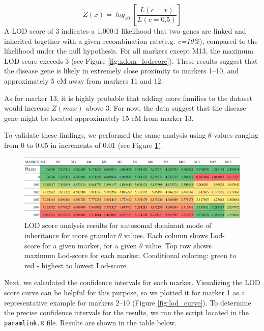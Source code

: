 \documentclass[a4paper,12pt]{article}
\begin{document}
\[
\mathit{Z(x) = \log_{10} \left[ \frac{L(c = x)}{L(c = 0.5)} \right]}
\]
A LOD score of 3 indicates a 1,000:1 likelihood that two genes are linked and inherited together with a given 
recombination rate(e.g. \textit{c=10\%}), compared to the likelihood under the null hypothesis.
For all markers except M13, the maximum LOD score exceeds 3 (see Figure \ref{fig:xdom_lodscore}).
These results suggest that the disease gene is likely in extremely close proximity to markers 1–10, 
and approximately 5 cM away from markers 11 and 12.

As for marker 13, it is highly probable that adding more families to the dataset would increase $\mathit{Z(max)}$ 
above 3. For now, the data suggest that the disease gene might be located approximately 15 cM from marker 13.

To validate these findings, we performed the same analysis using $\theta$ values ranging from 0 to 0.05 in 
increments of 0.01 (see Figure \ref{fig:xdom_lodscore_granular}).



\begin{figure}[t] %
    \centering
    \includegraphics[width=\textwidth]{images/xdom_lod_analysis_more_granular.png}
    \caption{LOD score analysis results for autosomal dominant mode of inheritance for more 
    granular $\theta$ values. Each column shows Lod-score for a given marker, for a given 
    $\theta$ value. Top row shows maximum Lod-score for each marker. Conditional coloring: 
    green to red - highest to lowest Lod-score.}   
    \label{fig:xdom_lodscore_granular} 
    
\end{figure}

Next, we calculated the confidence intervals for each marker. %
Visualizing the LOD score curve can be helpful for this purpose, so we plotted it for marker 1 as 
a representative example for markers 2–10 (Figure \ref{fig:lod_curve}). 
To determine the precise confidence intervals for the results, we ran the script located in 
the \texttt{paramlink.R} file. Results are shown in the table below.
\end{document}
